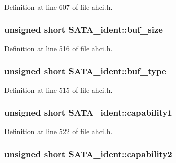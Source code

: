 Definition at line 607 of file ahci.\+h.

\subsubsection[{\texorpdfstring{buf\+\_\+size}{buf_size}}]{\setlength{\rightskip}{0pt plus 5cm}unsigned short S\+A\+T\+A\+\_\+ident\+::buf\+\_\+size}\hypertarget{structSATA__ident_a775f5fa54b6bcb76cc9f93a38bd09c99}{}\label{structSATA__ident_a775f5fa54b6bcb76cc9f93a38bd09c99}


Definition at line 516 of file ahci.\+h.

\subsubsection[{\texorpdfstring{buf\+\_\+type}{buf_type}}]{\setlength{\rightskip}{0pt plus 5cm}unsigned short S\+A\+T\+A\+\_\+ident\+::buf\+\_\+type}\hypertarget{structSATA__ident_a697bedabe956a0d4022ef9c2aca00c97}{}\label{structSATA__ident_a697bedabe956a0d4022ef9c2aca00c97}


Definition at line 515 of file ahci.\+h.

\subsubsection[{\texorpdfstring{capability1}{capability1}}]{\setlength{\rightskip}{0pt plus 5cm}unsigned short S\+A\+T\+A\+\_\+ident\+::capability1}\hypertarget{structSATA__ident_a31f63a30e501d36ba2f2c5ccf573a51e}{}\label{structSATA__ident_a31f63a30e501d36ba2f2c5ccf573a51e}


Definition at line 522 of file ahci.\+h.

\subsubsection[{\texorpdfstring{capability2}{capability2}}]{\setlength{\rightskip}{0pt plus 5cm}unsigned short S\+A\+T\+A\+\_\+ident\+::capability2}\hypertarget{structSATA__ident_a0dffaaa0f1a60b51faf00a3ca2c993ac}{}\label{structSATA__ident_a0dffaaa0f1a60b51faf00a3ca2c993ac}


